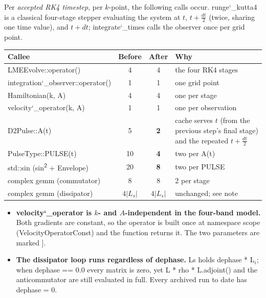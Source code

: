 \documentclass[11pt,a4paper]{article}
\newcommand{\brk}{\discretionary{}{}{}}
\newcommand{\uu}{\char`_\brk}
\newcommand{\fn}[1]{{\ttfamily #1}}
\begin{document}
Per \emph{accepted RK4 timestep}, per $k$-point, the following calls occur.
\fn{runge\uu kutta4} is a classical four-stage stepper evaluating the system at
$t$, $t+\tfrac{dt}{2}$ (twice, sharing one time value), and $t+dt$;
\fn{integrate\uu times} calls the observer once per grid point.

\begin{center}
\scriptsize
\begin{tabular}{@{}L{0.40\textwidth} c c L{0.30\textwidth}@{}}
\toprule
\textbf{Callee} & \textbf{Before} & \textbf{After} & \textbf{Why} \\
\midrule
\fn{LMEEvolve::operator()}         & 4 & 4 & the four RK4 stages \\
\fn{integration\uu observer::operator()} & 1 & 1 & one grid point \\
\fn{Hamiltonian(k, A)}             & 4 & 4 & one per stage \\
\fn{velocity\uu operator(k, A)}    & 1 & 1 & one per observation \\
\midrule
\fn{D2Pulse::A(t)}                 & 5 & \textbf{2} & cache serves $t$ (from the previous step's final stage) and the repeated $t+\tfrac{dt}{2}$ \\
\fn{PulseType::PULSE(t)}           & 10 & \textbf{4} & two per \fn{A(t)} \\
\fn{std::sin} (\fn{sin\textsuperscript{2}} + \fn{Envelope}) & 20 & \textbf{8} & two per \fn{PULSE} \\
\midrule
complex \fn{gemm} (commutator)     & 8  & 8  & 2 per stage \\
complex \fn{gemm} (dissipator)     & $4|L_s|$ & $4|L_s|$ & unchanged; see note \\
\bottomrule
\end{tabular}
\end{center}

\begin{keybox}[title={Two structural properties worth knowing}]
\begin{itemize}
  \item \textbf{\fn{velocity\uu operator} is $k$- and $A$-independent in the
        four-band model.} Both gradients are constant, so the operator is built
        once at namespace scope (\fn{VelocityOperatorConst}) and the function
        returns it. The two parameters are marked \fn{[[maybe\uu unused]]}.
  \item \textbf{The dissipator loop runs regardless of \fn{dephase}.} \fn{Ls}
        holds \fn{dephase * L}$_i$; when \fn{dephase == 0.0} every matrix is
        zero, yet \fn{L * rho * L.adjoint()} and the anticommutator are still
        evaluated in full. Every archived run to date has \fn{dephase = 0}.
\end{itemize}
\end{keybox}
\end{document}
